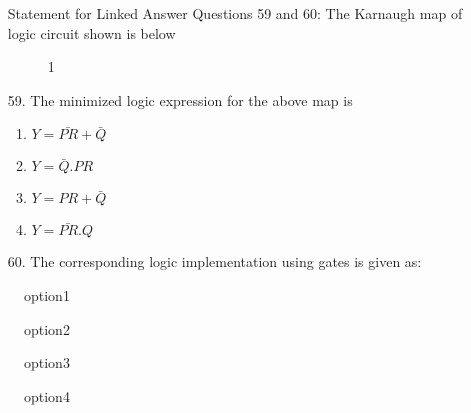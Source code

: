 \documentclass[journal]{IEEEtran}
\begin{document}
\begin{enumerate}
    Statement for Linked Answer Questions 59 and 60:
    The Karnaugh map of logic circuit shown is below 
    \newpage
    \begin{figure}[!ht]
        \centering
        \caption{1}
        \label{fig1}
    \end{figure}
    \item[59.] The minimized logic expression for the above map is 
    \begin{enumerate}[label=(\Alph*)]
        \item $Y=\bar{PR} + \bar{Q}$
        \item $Y=\bar{Q} .PR$
        \item $Y=PR + \bar{Q}$
        \item $Y=\bar{PR}.Q$
    \end{enumerate}
    \item[60.] The corresponding logic implementation using gates is given as:
     \end{enumerate}
    \begin{figure}[!ht]
        \centering
        \caption{option1}
    \end{figure}
    \begin{figure}[!ht]
        \centering
        \caption{option2}
    \end{figure}
    \begin{figure}[!ht]
        \centering
        \caption{option3}
    \end{figure}
    \begin{figure}[!ht]
        \centering
        \caption{option4}
    \end{figure}
\end{document}
